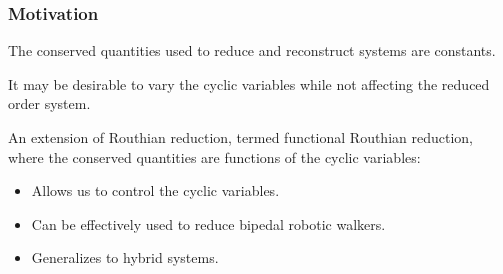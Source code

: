 \documentclass{beamer}
\begin{document}
\begin{frame}
  \frametitle{Motivation}
  \begin{description}[D]
  \item[ Classical Reduction:]  The conserved quantities used to reduce and reconstruct systems are constants.
  \item[ Yet:]  It may be desirable to \alert{vary} the cyclic variables while not affecting the reduced order system.
  \item[ Motivates:]  An extension of Routhian reduction, termed \alert{functional Routhian reduction}, where the conserved quantities are functions of the cyclic variables:
    \begin{itemize}
    \item Allows us to control the cyclic variables.
    \item Can be effectively used to reduce bipedal robotic walkers.
    \item Generalizes to hybrid systems.
    \end{itemize}
  \end{description}
\end{frame}
\end{document}
